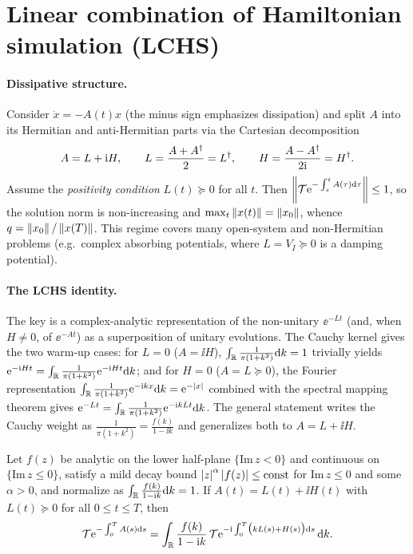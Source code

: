 \section{Linear combination of Hamiltonian simulation (LCHS)}
\label{sec:lec13-4}

\paragraph{Dissipative structure.}
Consider $\dot x=-A(t)x$ (the minus sign emphasizes dissipation) and split $A$ into its
Hermitian and anti-Hermitian parts via the Cartesian decomposition
\begin{equation}
  A=L+\mathrm{i} H,\qquad L=\frac{A+A^{\dagger}}{2}=L^{\dagger},\qquad H=\frac{A-A^{\dagger}}{2\mathrm{i}}=H^{\dagger}.
  \label{eq:lec13-cartesian}
\end{equation}
Assume the \emph{positivity condition} $L(t)\succeq0$ for all $t$. Then $\left\lVert \mathcal T
\mathrm{e}^{-\int_s^t A(\tau)\mathrm{d}\tau} \right\rVert\le1$, so the solution norm is non-increasing and
$\max_t\left\lVert x(t) \right\rVert=\left\lVert x_0 \right\rVert$, whence $q=\left\lVert x_0 \right\rVert/\left\lVert x(T) \right\rVert$. This regime covers many
open-system and non-Hermitian problems (e.g.\ complex absorbing potentials, where $L=V_I\succeq0$
is a damping potential).

\paragraph{The LCHS identity.}
The key is a complex-analytic representation of the non-unitary $\ee^{-Lt}$ (and, when $H\ne0$,
of $\ee^{-At}$) as a superposition of unitary evolutions. The Cauchy kernel gives the two
warm-up cases: for $L=0$ ($A=\ii H$), $\int_{\mathbb{R}}\frac{1}{\pi(1+k^2)}\mathrm{d} k=1$ trivially yields
$\mathrm{e}^{-\mathrm{i} Ht}=\int_{\mathbb{R}}\frac{1}{\pi(1+k^2)}\mathrm{e}^{-\mathrm{i} Ht}\mathrm{d} k$; and for $H=0$ ($A=L\succeq0$),
the Fourier representation $\int_{\mathbb{R}}\frac{1}{\pi(1+k^2)}\mathrm{e}^{-\mathrm{i} kx}\mathrm{d} k=\mathrm{e}^{-\left\lvert x \right\rvert}$ combined
with the spectral mapping theorem gives $\mathrm{e}^{-Lt}=\int_{\mathbb{R}}\frac{1}{\pi(1+k^2)}\mathrm{e}^{-\mathrm{i} kLt}\mathrm{d} k$.
The general statement writes the Cauchy weight as $\frac{1}{\pi(1+k^2)}=\frac{f(k)}{1-\ii k}$ and
generalizes both to $A=L+\ii H$.

\begin{theorem}
\label{thm:lec13-lchs}
Let $f(z)$ be analytic on the lower half-plane $\{\mathrm{Im}\,z<0\}$ and continuous on
$\{\mathrm{Im}\,z\le0\}$, satisfy a mild decay bound $\left\lvert z \right\rvert^\alpha\left\lvert f(z) \right\rvert\le\mathrm{const}$
for $\mathrm{Im}\,z\le0$ and some $\alpha>0$, and normalize as $\int_{\mathbb{R}}\frac{f(k)}{1-\mathrm{i} k}\mathrm{d} k=1$.
If $A(t)=L(t)+\ii H(t)$ with $L(t)\succeq0$ for all $0\le t\le T$, then
\begin{equation}
  \mathcal T\mathrm{e}^{-\int_0^T A(s)\mathrm{d} s}
  =\int_{\mathbb{R}}\frac{f(k)}{1-\mathrm{i} k}\,
   \mathcal T\mathrm{e}^{-\mathrm{i}\int_0^T\bigl(kL(s)+H(s)\bigr)\mathrm{d} s}\,\mathrm{d} k.
  \label{eq:lec13-lchs}
\end{equation}
\end{theorem}

